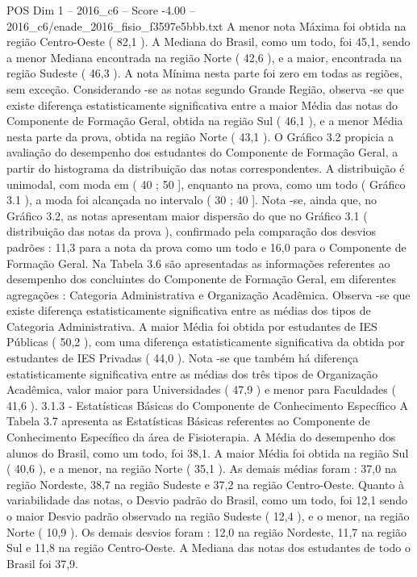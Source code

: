 \begin{textsample}{POS Dim 1 – 2016\_c6 – Score -4.00 – 2016\_c6/enade\_2016\_fisio\_f3597e5bbb.txt}
A menor nota Máxima foi obtida na região Centro-Oeste ( 82,1 ).
A Mediana do Brasil, como um todo, foi 45,1, sendo a menor Mediana encontrada na região Norte ( 42,6 ), e a maior, encontrada na região Sudeste ( 46,3 ).
A nota Mínima nesta parte foi zero em todas as regiões, sem exceção.
Considerando -se as notas segundo Grande Região, observa -se que existe diferença estatisticamente significativa entre a maior Média das notas do Componente de Formação Geral, obtida na região Sul ( 46,1 ), e a menor Média nesta parte da prova, obtida na região Norte ( 43,1 ).
O Gráfico 3.2 propicia a avaliação do desempenho dos estudantes do Componente de Formação Geral, a partir do histograma da distribuição das notas correspondentes.
A distribuição é unimodal, com moda em ( 40 ; 50 ], enquanto na prova, como um todo ( Gráfico 3.1 ), a moda foi alcançada no intervalo ( 30 ; 40 ].
Nota -se, ainda que, no Gráfico 3.2, as notas apresentam maior dispersão do que no Gráfico 3.1 ( distribuição das notas da prova ), confirmado pela comparação dos desvios padrões : 11,3 para a nota da prova como um todo e 16,0 para o Componente de Formação Geral.
Na Tabela 3.6 são apresentadas as informações referentes ao desempenho dos concluintes do Componente de Formação Geral, em diferentes agregações : Categoria Administrativa e Organização Acadêmica.
Observa -se que existe diferença estatisticamente significativa entre as médias dos tipos de Categoria Administrativa.
A maior Média foi obtida por estudantes de IES Públicas ( 50,2 ), com uma diferença estatisticamente significativa da obtida por estudantes de IES Privadas ( 44,0 ).
Nota -se que também há diferença estatisticamente significativa entre as médias dos três tipos de Organização Acadêmica, valor maior para Universidades ( 47,9 ) e menor para Faculdades ( 41,6 ). 3.1.3 - Estatísticas Básicas do Componente de Conhecimento Específico A Tabela 3.7 apresenta as Estatísticas Básicas referentes ao Componente de Conhecimento Específico da área de Fisioterapia.
A Média do desempenho dos alunos do Brasil, como um todo, foi 38,1.
A maior Média foi obtida na região Sul ( 40,6 ), e a menor, na região Norte ( 35,1 ).
As demais médias foram : 37,0 na região Nordeste, 38,7 na região Sudeste e 37,2 na região Centro-Oeste.
Quanto à variabilidade das notas, o Desvio padrão do Brasil, como um todo, foi 12,1 sendo o maior Desvio padrão observado na região Sudeste ( 12,4 ), e o menor, na região Norte ( 10,9 ).
Os demais desvios foram : 12,0 na região Nordeste, 11,7 na região Sul e 11,8 na região Centro-Oeste.
A Mediana das notas dos estudantes de todo o Brasil foi 37,9.

\end{textsample}
